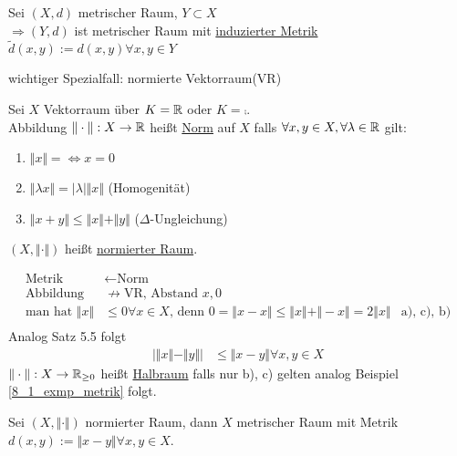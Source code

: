 \begin{exmpn}
	Sei $(X,d)$ metrischer Raum, $Y \subset X$\\
    $\Rightarrow (Y,d)$ ist metrischer Raum mit \underline{induzierter Metrik} $\tilde{d}(x,y):=d(x,y)\forall x,y \in Y$
\end{exmpn}

wichtiger Spezialfall: normierte Vektorraum(VR)

\begin{mydefn}[Norm]
    Sei $X$ Vektorraum über $K=\mathbb{R}$ oder $K=\comp$.\\
    Abbildung $\Vert \cdot \Vert: X \to \mathbb{R}$ heißt \underline{Norm} auf $X$ falls $\forall x,y \in X, \forall \lambda \in \mathbb{R}$ gilt:
    \begin{enumerate}[label={\alph*)}]
    \item $\Vert x\Vert = \Leftrightarrow x=0$
    \item $\Vert \lambda x\Vert = \vert \lambda \vert \Vert x\Vert$ (Homogenität)
    \item $\Vert x+y\Vert \leq \Vert x\Vert + \Vert y\Vert$ ($\Delta$-Ungleichung)
    \end{enumerate}
    $(X,\Vert \cdot\Vert)$ heißt \underline{normierter Raum}.
\end{mydefn}

\begin{align*}
    \text{Metrik} &\leftarrow \text{Norm}&\\
    \text{Abbildung} & \not \rightarrow \text{VR, Abstand } x,0\\
    \text{man hat } \Vert x \Vert &\leq 0 \forall x \in X \text{, denn } 0 = \Vert x-x\Vert \leq \Vert x\Vert + \Vert -x\Vert = 2\Vert x\Vert & \text{a), c), b)}\\   
\end{align*}
Analog Satz 5.5 folgt\\
\begin{align}
    \vert \Vert x \Vert - \Vert y \Vert\vert &\leq \Vert x-y\Vert \forall x,y \in X
\end{align}
$\Vert \cdot\Vert: X \to \mathbb{R}_{\geq0}$ heißt \underline{Halbraum} falls nur b), c) gelten analog Beispiel \ref{8_1_exmp_metrik} folgt.

\begin{satz}
    Sei $(X,\Vert\cdot \Vert)$ normierter Raum, dann $X$ metrischer Raum mit Metrik $d(x,y):=\Vert x-y \Vert\forall x,y \in X$.
\end{satz}

